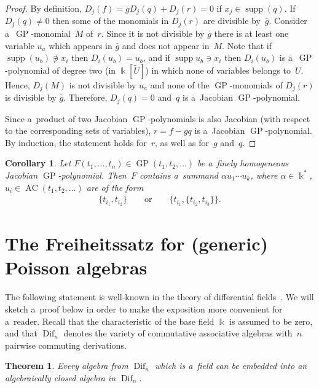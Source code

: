 \documentclass[11pt]{article}
\newtheorem{theorem}{Theorem}
\newtheorem{corollary}{Corollary}
\DeclareMathOperator{\supp}{supp}
\begin{document}
\begin{proof}
By def\/inition, $D_j(f) = gD_j(q) + D_j(r) = 0$ if $x_j \in \supp(q)$.
If $D_j(q) \neq 0$ then some of the monomials in $D_j(r)$ are divisible by~$\bar g$.
Consider a~$\operatorname{GP}$-monomial~$M$ of~$r$.
Since it is not divisible by $\bar g$ there is at least one variable $u_a$ which appears in $\bar g$ and does not appear
in~$M$.
Note that if $\supp(u_b) \not\ni x_i$ then $D_i(u_b) = u_b$, and if $\supp u_b \ni x_i$ then
$D_i(u_b)$ is a~$\operatorname{GP}$-polynomial of degree two (in $\Bbbk[\widetilde U]$) in which none of variables belongs to~$U$.
Hence, $D_j(M)$ is not divisible by $u_a$ and none of the $\operatorname{GP}$-monomials of $D_j(r)$ is divisible by $\bar g$.
Therefore, $D_j(q) = 0$ and~$q$ is a~Jacobian $\operatorname{GP}$-polynomial.

Since a~product of two Jacobian $\operatorname{GP}$-polynomials is also Jacobian (with respect to the corresponding sets of variables),
$r=f-gq$ is a~Jacobian $\operatorname{GP}$-polynomial.
By induction, the statement holds for~$r$, as well as for~$g$ and~$q$.
\end{proof}

\begin{corollary}
\label{cor:2DerLeftJustified}
Let $F(t_1,\dots, t_n) \in \operatorname{GP}(t_1,t_2, \dots)$ be a~finely homogeneous Jacobian $\operatorname{GP}$-poly\-no\-mi\-al.
Then~$F$ contains a~summand $\alpha u_1\cdots u_k$, where $\alpha \in \Bbbk^*$, $u_i\in \operatorname{AC}(t_1,t_2, \dots)$ are of the
form
\begin{gather*}
\{t_{i_1},t_{i_2}\}
\qquad
\text{or}
\qquad
\{t_{i_1},\{t_{i_2},t_{i_3}\}\}.
\end{gather*}
\end{corollary}


\section{The Freiheitssatz for (generic) Poisson algebras}

The following statement is well-known in the theory of dif\/ferential f\/ields~\cite{Kolchin, Ritt}.
We will sketch a~proof below in order to make the exposition more convenient for a~reader.
Recall that the characteristic of the base f\/ield $\Bbbk $ is assumed to be zero, and that $\operatorname{Dif}_n$ denotes the variety of
commutative associative algebras with~$n$ pairwise commuting derivations.

\begin{theorem}
Every algebra from $\operatorname{Dif}_n$ which is a~field can be embedded into an algebraically closed algebra in $\operatorname{Dif}_n$.
\end{theorem}
\end{document}
